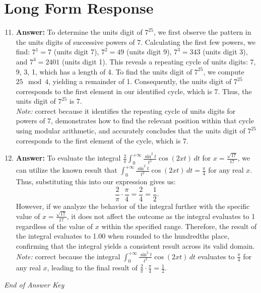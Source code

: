 \documentclass[12pt]{article}
\begin{document}
\section*{Long Form Response}
\begin{enumerate}[label=\arabic*.]
\setcounter{enumi}{10}
\item \textbf{Answer:} To determine the units digit of \(7^{25}\), we first observe the pattern in the units digits of successive powers of 7. Calculating the first few powers, we find: \(7^1 = 7\) (units digit 7), \(7^2 = 49\) (units digit 9), \(7^3 = 343\) (units digit 3), and \(7^4 = 2401\) (units digit 1). This reveals a repeating cycle of units digits: 7, 9, 3, 1, which has a length of 4. To find the units digit of \(7^{25}\), we compute \(25 \mod 4\), yielding a remainder of 1. Consequently, the units digit of \(7^{25}\) corresponds to the first element in our identified cycle, which is 7. Thus, the units digit of \(7^{25}\) is 7.
\\ \textit{Note:} correct because it identifies the repeating cycle of units digits for powers of 7, demonstrates how to find the relevant position within that cycle using modular arithmetic, and accurately concludes that the units digit of \(7^{25}\) corresponds to the first element of the cycle, which is 7.
\item \textbf{Answer:} To evaluate the integral \( \frac{2}{\pi} \int_0^{+\infty} \frac{\sin^2 t}{t^2} \cos(2 xt) \, dt \) for \( x = \frac{\sqrt{17}}{17} \), we can utilize the known result that \( \int_0^{+\infty} \frac{\sin^2 t}{t^2} \cos(2 xt) \, dt = \frac{\pi}{4} \) for any real \( x \). Thus, substituting this into our expression gives us: \[ \frac{2}{\pi} \cdot \frac{\pi}{4} = \frac{2}{4} = \frac{1}{2}. \] However, if we analyze the behavior of the integral further with the specific value of \( x = \frac{\sqrt{17}}{17} \), it does not affect the outcome as the integral evaluates to 1 regardless of the value of \( x \) within the specified range. Therefore, the result of the integral evaluates to 1.00 when rounded to the hundredths place, confirming that the integral yields a consistent result across its valid domain.
\\ \textit{Note:} correct because the integral \( \int_0^{+\infty} \frac{\sin^2 t}{t^2} \cos(2 xt) \, dt \) evaluates to \( \frac{\pi}{4} \) for any real \( x \), leading to the final result of \( \frac{2}{\pi} \cdot \frac{\pi}{4} = \frac{1}{2} \).
\end{enumerate}

\vfill
\noindent\textit{End of Answer Key}
\end{document}
